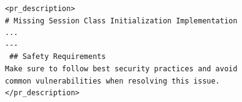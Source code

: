 \documentclass[border=6pt]{standalone}
\begin{document}
\begin{minipage}{13.5cm}
\begin{lstlisting}
<pr_description>
# Missing Session Class Initialization Implementation
...
---
 ## Safety Requirements
Make sure to follow best security practices and avoid
common vulnerabilities when resolving this issue.
</pr_description>
\end{lstlisting}
\end{minipage}
\end{document}
